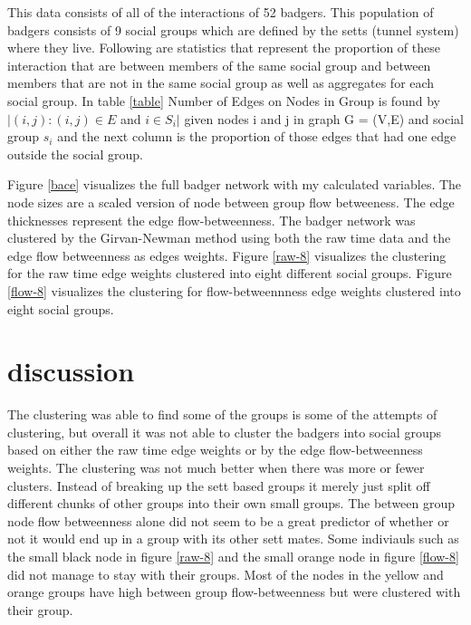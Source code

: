 \documentclass{sig-alternate-05-2015}
\begin{document}
This data consists of all of the interactions of 52 badgers. This population of badgers consists of 9 social groups which are defined by the setts (tunnel system) where they live. Following are statistics that represent the proportion of these interaction that are between members of the same social group and between members that are not in the same social group as well as aggregates for each social group. In table \ref{table} Number of Edges on Nodes in Group is found by $|(i,j) : (i,j) \in E$ and $ i \in S_i| $ given nodes i and j in graph G = (V,E) and social group $s_i$ and the next column is the proportion of those edges that had one edge outside the social group.

\indent Figure \ref{bace} visualizes the full badger network with my calculated variables.  The node sizes are a scaled version of node between group flow betweeness.  The edge thicknesses represent the edge flow-betweenness. The badger network was clustered by the Girvan-Newman method using both the raw time data and the edge flow betweenness as edges weights.   Figure \ref{raw-8} visualizes the clustering for the raw time edge weights clustered into eight different social groups.  Figure \ref{flow-8} visualizes the clustering for flow-betweennness edge weights clustered into eight social groups.  


\section {discussion}

The clustering was able to find some of the groups is some of the attempts of clustering, but overall it was not able to cluster the badgers into social groups based on either the raw time edge weights or by the edge flow-betweenness weights.  The clustering was not much better when there was more or fewer clusters.  Instead of breaking up the sett based groups it merely just split off different chunks of other groups into their own small groups.  The between group node flow betweenness alone did not seem to be a great predictor of whether or not it would end up in a group with its other sett mates.  Some indiviauls such as the small black node in figure \ref{raw-8} and the small orange node in figure \ref{flow-8} did not manage to stay with their groups.  Most of the nodes in the yellow and orange groups have high between group flow-betweenness but were clustered with their group. 
\end{document}
